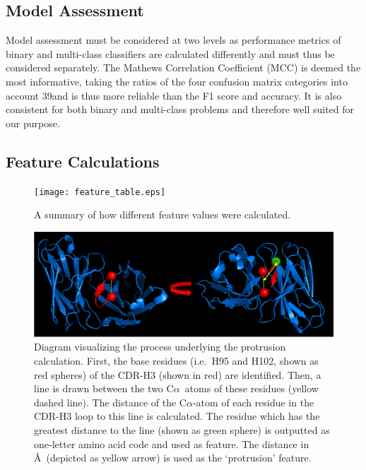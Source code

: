 \documentclass[12pt]{article}
\newcommand{\ca}{\mbox{C$\alpha$}}
\begin{document}
\subsection{Model Assessment} 
Model assessment must be considered at two levels as performance
metrics of binary and multi-class classifiers are calculated
differently and must thus be considered separately. The Mathews
Correlation Coefficient (MCC)\cite{Matthews1975} is deemed the most
informative, taking the ratios of the four confusion matrix categories
into account 39and is thus more reliable than the F1 score and
accuracy. It is also consistent for both binary and multi-class
problems and therefore well suited for our purpose.
 
\subsection{Feature Calculations}
\begin{figure}
  \centering
  \texttt{[image: feature\_table.eps]}
  \caption {A summary of how different feature values were calculated.}
  \label{fig:feature_table}
\end{figure}

\begin{figure}
  \centering
  \includegraphics[width=\linewidth]{angle.eps}
  \caption {Diagram visualizing the process underlying the protrusion
    calculation. First, the base residues (i.e.\ H95 and H102, shown as
    red spheres) of the CDR-H3 (shown in red) are identified. Then, a
    line is drawn between the two \ca\ atoms of these residues (yellow
    dashed line). The distance of the \ca-atom of each residue in the
    CDR-H3 loop to this line is calculated. The residue which has the
    greatest distance to the line (shown as green sphere) is outputted
    as one-letter amino acid code and used as feature. The distance in
    \AA\ (depicted as yellow arrow) is used as the `protrusion'
    feature.}
  \label{fig:angle}
\end{figure}
\end{document}

